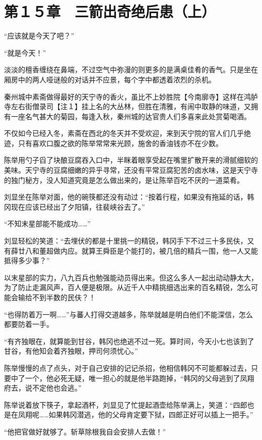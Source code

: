 \section{第１５章　三箭出奇绝后患（上）}

“应该就是今天了吧？”

“就是今天！”

淡淡的檀香缠绕在鼻端，不过空气中弥漫的则更多的是满桌佳肴的香气。只是坐在厢房中的两人哑谜般的对话并不应景，每个字中都透着浓烈的杀机。

秦州城中素斋做得最好的天宁寺的香火，虽比不上妙胜院【今南廓寺】这样在鸿胪寺左右街僧录司【注１】挂上名的大丛林，但胜在清雅，有闹中取静的味道，又拥有一座名气甚大的菊园，每逢入秋，秦州城的达官贵人们多喜来此处赏菊喝酒。

不仅如今已经入冬，素斋在西北的冬天并不受欢迎，来到天宁院的官人们几乎绝迹，只有喜欢口腹之欲的陈举常常来光顾，施舍的香油钱亦不在少数。

陈举用勺子舀了块酿豆腐吞入口中，半眯着眼享受起在嘴里扩散开来的滑腻细软的美味。天宁寺的豆腐细嫩的异乎寻常，还没有平常豆腐犯苦的卤水味，这是天宁寺的独门秘方，没人知道究竟是怎么做出来的，是让陈举百吃不厌的一道菜肴。

刘显坐在陈举对面，他的碗筷都还没有动过：“按着行程，如果没有拖延的话，韩冈现在应该已经出了夕阳镇，往裴峡谷去了。”

“不知末星部能不能成功……”

刘显轻松的笑道：“去埋伏的都是十里挑一的精锐，韩冈手下不过三十多民伕，又有薛廿八和董超做内应。就算王舜臣是个能打的，被几倍的精兵一围，他一人又能抵得多少事？”

以末星部的实力，八九百兵也勉强能动员得出来。但这么多人一起出动动静太大，为了防止走漏风声，百人便是极限。从近千人中精挑细选出来的百名精锐，怎么可能会输给不到半数的民伕？！

“也得防着万一啊……”与蕃人打得交道越多，陈举就越是明白他们不能深信，怎么都要防着一手。

“有齐独眼在，就算能到甘谷，韩冈也绝逃不过一死。算时间，今天小七也该到了甘谷，有他知会着齐独眼，押司何须忧心。”

陈举慢慢的点了点头，对于自己安排的记记杀招，他相信韩冈不可能都躲过去，只要中了一个，他必死无疑，唯一担心的就是他半路跑掉，“韩冈的父母逃到了凤翔府去，说不定他也会逃。”

陈举说着放下筷子，拿起酒杯，刘显见了忙提起酒壶给陈举满上，笑道：“四郎也是在凤翔呢……如果韩冈潜逃，他的父母肯定要下狱，四郎正好可以插上一把手。”

“他把官做好就够了。斩草除根我自会安排人去做！”

